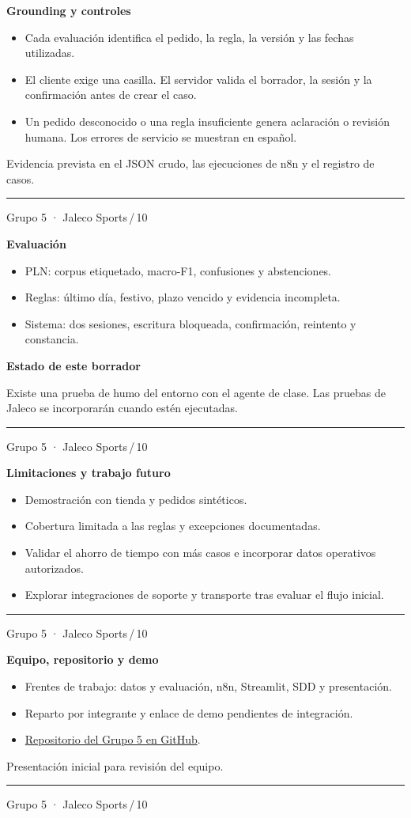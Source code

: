 \documentclass[11pt]{article}
\newenvironment{slide}[1]{%
  \thispagestyle{empty}%
  \begin{minipage}[t][0.97\textheight][t]{\textwidth}%
  \begingroup\setlength{\fboxsep}{6pt}%
  \colorbox{Pino}{\parbox{\dimexpr\linewidth-2\fboxsep\relax}{\color{white}\Large\bfseries #1}}%
  \endgroup\par\medskip
}{%
  \par\vfill\hrule\smallskip
  {\scriptsize Grupo 5 · Jaleco Sports\hfill\thepage\,/\,10}\par
  \end{minipage}\newpage
}
\newenvironment{block}[1]{%
  \par\medskip\textcolor{Mineral}{\bfseries #1}\par\smallskip
}{\par\medskip}
\begin{document}
\begin{slide}{Grounding y controles}
  \begin{itemize}
    \item Cada evaluación identifica el pedido, la regla, la versión y las fechas utilizadas.
    \item El cliente exige una casilla. El servidor valida el borrador, la sesión y la confirmación antes de crear el caso.
    \item Un pedido desconocido o una regla insuficiente genera aclaración o revisión humana. Los errores de servicio se muestran en español.
  \end{itemize}
  \medskip Evidencia prevista en el JSON crudo, las ejecuciones de n8n y el registro de casos.
\end{slide}

\begin{slide}{Evaluación}
  \begin{itemize}
    \item PLN: corpus etiquetado, macro-F1, confusiones y abstenciones.
    \item Reglas: último día, festivo, plazo vencido y evidencia incompleta.
    \item Sistema: dos sesiones, escritura bloqueada, confirmación, reintento y constancia.
  \end{itemize}
  \begin{block}{Estado de este borrador}
    Existe una prueba de humo del entorno con el agente de clase. Las pruebas de Jaleco se incorporarán cuando estén ejecutadas.
  \end{block}
\end{slide}

\begin{slide}{Limitaciones y trabajo futuro}
  \begin{itemize}
    \item Demostración con tienda y pedidos sintéticos.
    \item Cobertura limitada a las reglas y excepciones documentadas.
    \item Validar el ahorro de tiempo con más casos e incorporar datos operativos autorizados.
    \item Explorar integraciones de soporte y transporte tras evaluar el flujo inicial.
  \end{itemize}
\end{slide}

\begin{slide}{Equipo, repositorio y demo}
  \begin{itemize}
    \item Frentes de trabajo: datos y evaluación, n8n, Streamlit, SDD y presentación.
    \item Reparto por integrante y enlace de demo pendientes de integración.
    \item \href{https://github.com/juancohen117/ProcesamientoLenguajeNatural/tree/main/Proyecto-Final-Grupo5}{Repositorio del Grupo 5 en GitHub}.
  \end{itemize}
  \medskip Presentación inicial para revisión del equipo.
\end{slide}
\end{document}
